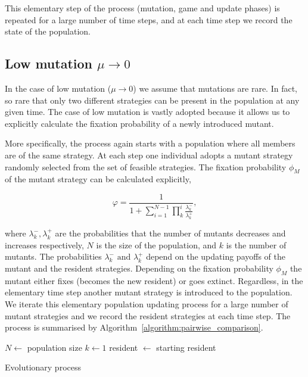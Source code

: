 \documentclass[11pt]{article}
\theoremstyle{plainCl1}
\theoremstyle{plainCl2}
\begin{document}
This elementary step of the process (mutation, game and update phases) is
repeated for a large number of time steps, and at each time step we record the
state of the population.

\subsection{Low mutation \(\mu \rightarrow 0\)}

In the case of low mutation (\(\mu \rightarrow 0\)) we assume that mutations are
rare. In fact, so rare that only two different strategies can be present in the
population at any given time. The case of low mutation is vastly adopted because
it allows us to explicitly calculate the fixation probability of a newly
introduced mutant.

More specifically, the process again starts with a population where all members are of the same
strategy. At each step one individual adopts a mutant strategy randomly selected
from the set of feasible strategies. The fixation probability \(\phi_{M}\) of the
mutant strategy can be calculated explicitly,

\begin{equation}\label{eq:appendix_fixation_probability}
    \varphi = \frac{1}{1+\sum\limits_{i=1}^{N-1}\prod\limits_k^i \frac{\lambda^-_k}{\lambda^+_k}},
\end{equation}

where \(\lambda^-_k, \lambda^+_k\) are the probabilities that the number of
mutants decreases and increases respectively, \(N\) is the size of the
population, and \(k\) is the number of mutants. The probabilities \(\lambda^-_k
\text{ and } \lambda^+_k\) depend on the updating payoffs of the mutant and the
resident strategies. Depending on the fixation probability \(\phi_{M}\) the
mutant either fixes (becomes the new resident) or goes extinct. Regardless, in
the elementary time step another mutant strategy is introduced to the
population. We iterate this elementary population updating process for a large
number of mutant strategies and we record the resident strategies at each time
step. The process is summarised by Algorithm~\ref{algorithm:pairwise_comparison}.

\begin{algorithm}[!htbp]
  \SetAlgoLined $N \leftarrow$ population size\; $k \leftarrow 1$\; resident
   $\leftarrow$ starting resident\;  \caption{Evolutionary
   process}\label{algorithm:pairwise_comparison}
\end{algorithm}
\end{document}
